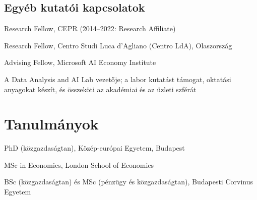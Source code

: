 \documentclass[10pt,a4paper]{article}
\begin{document}
\subsection{Egyéb kutatói kapcsolatok}
\begin{cvlist}
  \item[2022--] Research Fellow, CEPR (2014--2022: Research Affiliate)
  \item[] Research Fellow, Centro Studi Luca d'Agliano (Centro LdA), Olaszország
  \item[2025--] Advising Fellow, Microsoft AI Economy Institute
  \item[] A Data Analysis and AI Lab vezetője; a labor kutatást támogat, oktatási anyagokat készít, és összeköti az akadémiai és az üzleti szférát
\end{cvlist}

\section{Tanulmányok}
\begin{cvlist}
  \item[2007] PhD (közgazdaságtan), Közép-európai Egyetem, Budapest
  \item[2000] MSc in Economics, London School of Economics
  \item[1999] BSc (közgazdaságtan) és MSc (pénzügy és közgazdaságtan), Budapesti Corvinus Egyetem
\end{cvlist}

\end{document}
